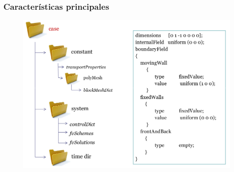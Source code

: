 \begin{frame}
    \frametitle{Caracter\'isticas principales}
    
    \begin{figure}
        \centering
        \includegraphics[scale=0.3]{Imagenes/file_structure}
    \end{figure}
    
\end{frame}


